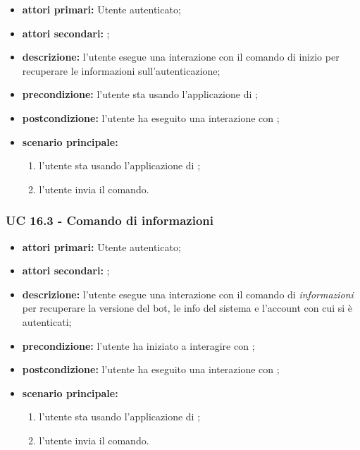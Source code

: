 	\begin{itemize}
		\item \textbf{attori primari:} Utente autenticato;
		\item \textbf{attori secondari:} ;
		\item \textbf{descrizione:} l'utente esegue una interazione con il comando di inizio per recuperare le informazioni sull'autenticazione;
		\item \textbf{precondizione:} l'utente sta usando l'applicazione di ;
		\item \textbf{postcondizione:} l'utente ha eseguito una interazione con ;
		\item \textbf{scenario principale:}
		\begin{enumerate}
			\item l'utente sta usando l'applicazione di ;
			\item l'utente invia il comando.
		\end{enumerate}
	\end{itemize}


	\subsubsection{UC 16.3 - Comando di informazioni}

	\begin{itemize}
		\item \textbf{attori primari:} Utente autenticato;
		\item \textbf{attori secondari:} ;
		\item \textbf{descrizione:} l'utente esegue una interazione con il comando di \textit{informazioni} per recuperare la versione del bot, le info del sistema e l'account con cui si è autenticati;
		\item \textbf{precondizione:} l'utente ha iniziato a interagire con ;
		\item \textbf{postcondizione:} l'utente ha eseguito una interazione con ;
		\item \textbf{scenario principale:}
		\begin{enumerate}
			\item l'utente sta usando l'applicazione di ; 
			\item l'utente invia il comando.
		\end{enumerate}
	\end{itemize}



